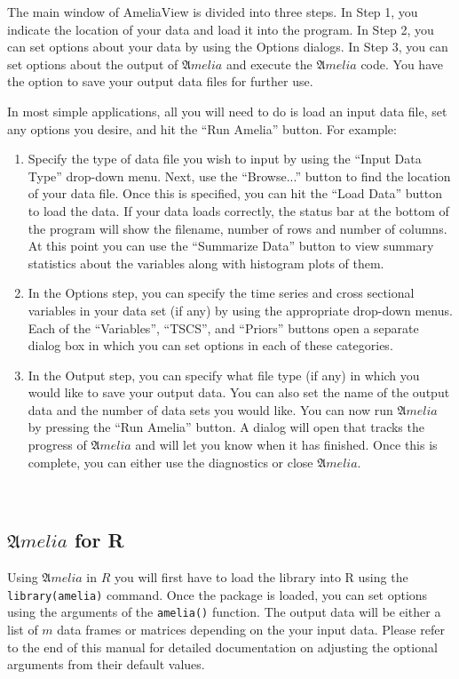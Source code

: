 \documentclass[12pt,titlepage]{article}
\newcommand{\Amelia}{\ensuremath{\mathfrak Amelia} }
\begin{document}
The main window of AmeliaView is divided into three steps.  In Step 1,
you indicate the location of your data and load it into the program.
In Step 2, you can set options about your data by using the Options
dialogs.  In Step 3, you can set options about the output of
${\mathfrak Amelia}$ and execute the ${\mathfrak Amelia}$ code.  You
have the option to save your output data files for further use.

In most simple applications, all you will need to do is load an input
data file, set any options you desire, and hit the ``Run Amelia''
button.  For example:
\begin{enumerate}
\item Specify the type of data file you wish to input by using the
  ``Input Data Type'' drop-down menu.  Next, use the ``Browse...''
  button to find the location of your data file.  Once this is
  specified, you can hit the ``Load Data'' button to load the data.
  If your data loads correctly, the status bar at the bottom of the
  program will show the filename, number of rows and number of
  columns.  At this point you can use the ``Summarize Data'' button to
  view summary statistics about the variables along with histogram
  plots of them.
\item In the Options step, you can specify the time series and cross
  sectional variables in your data set (if any) by using the
  appropriate drop-down menus.  Each of the ``Variables'', ``TSCS'',
  and ``Priors'' buttons open a separate dialog box in which you can
  set options in each of these categories.
\item In the Output step, you can specify what file type (if any) in
  which you would like to save your output data.  You can also set the
  name of the output data and the number of data sets you would like.
  You can now run ${\mathfrak Amelia}$ by pressing the ``Run Amelia''
  button.  A dialog will open that tracks the progress of ${\mathfrak
    Amelia}$ and will let you know when it has finished.  Once this is
  complete, you can either use the diagnostics or close ${\mathfrak
    Amelia}$.
\end{enumerate}

\ 
\subsection{\Amelia for R}
\label{sec:roverview}
Using \Amelia in $R$ you will first have to load the library into R
using the \texttt{library(amelia)} command.  Once the package is
loaded, you can set options using the arguments of the
\texttt{amelia()} function.  The output data will be either a list of
$m$ data frames or matrices depending on the your input data.  Please
refer to the end of this manual for detailed documentation on
adjusting the optional arguments from their default values.
\end{document}
